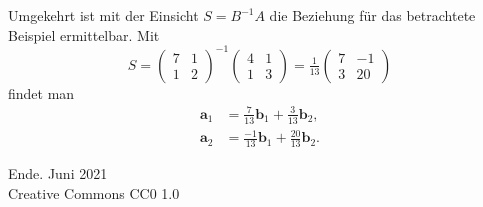 \documentclass[9pt]{beamer}
\newcommand{\modest}[1]{{\small\color{gray}#1}}
\newcommand{\bv}[1]{\mathbf{#1}}
\begin{document}
\begin{frame}
Umgekehrt ist mit der Einsicht $S = B^{-1}A$ die Beziehung
für das betrachtete Beispiel ermittelbar. Mit
\[S = \begin{pmatrix}7 & 1\\ 1 & 2\end{pmatrix}^{-1}
\begin{pmatrix}4 & 1\\ 1 & 3\end{pmatrix}
= \tfrac{1}{13}\begin{pmatrix}7 & -1\\ 3 & 20\end{pmatrix}\]
findet man
\begin{align*}
\bv a_1 &= \tfrac{7}{13}\bv b_1 + \tfrac{3}{13}\bv b_2,\\
\bv a_2 &= \tfrac{-1}{13}\bv b_1 + \tfrac{20}{13}\bv b_2.
\end{align*}
\end{frame}

\begin{frame}
Ende.
\vfill\hfill\modest{Juni 2021}\\
\hfill\modest{Creative Commons CC0 1.0}
\end{frame}
\end{document}
